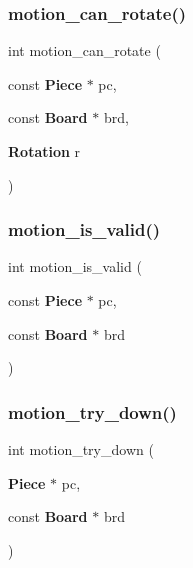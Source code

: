 \mbox{\label{motion_8h_ad3500291202fdc724ca7babd2df944ba}} 
\subsubsection{motion\+\_\+can\+\_\+rotate()}
{\footnotesize\ttfamily int motion\+\_\+can\+\_\+rotate (\begin{DoxyParamCaption}\item[{const \textbf{ Piece} $\ast$}]{pc,  }\item[{const \textbf{ Board} $\ast$}]{brd,  }\item[{\textbf{ Rotation}}]{r }\end{DoxyParamCaption})}

\mbox{\label{motion_8h_ae67cef6a127c61180c181edb84120ef9}} 
\subsubsection{motion\+\_\+is\+\_\+valid()}
{\footnotesize\ttfamily int motion\+\_\+is\+\_\+valid (\begin{DoxyParamCaption}\item[{const \textbf{ Piece} $\ast$}]{pc,  }\item[{const \textbf{ Board} $\ast$}]{brd }\end{DoxyParamCaption})}

\mbox{\label{motion_8h_af0d588d036f656d0f629b8115b45df60}} 
\subsubsection{motion\+\_\+try\+\_\+down()}
{\footnotesize\ttfamily int motion\+\_\+try\+\_\+down (\begin{DoxyParamCaption}\item[{\textbf{ Piece} $\ast$}]{pc,  }\item[{const \textbf{ Board} $\ast$}]{brd }\end{DoxyParamCaption})}

\mbox{\label{motion_8h_a2cf016bccf6ca6fa09a3cb5362fbd6b7}} 
